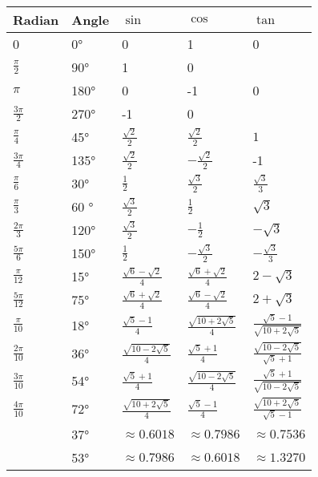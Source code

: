 \documentclass[a4paper,12pt]{report}
\begin{document}
{\fontsize{8pt}{10pt}\selectfont
\begin{longtable}[c]{|p{}|p{}|p{}|p{}|p{}|}
\hline
Radian & Angle & $\sin$ & $\cos$ & $\tan$ \\\hline\endhead
0 & 0° & 0 & 1 & 0 \\\hline
$\frac{\pi}{2}$ & 90° & 1 & 0 & \\\hline
$\pi$ & 180° & 0 & -1 & 0 \\\hline
$\frac{3\pi}{2}$ & 270° & -1 & 0 & \\\hline
$\frac{\pi}{4}$ & 45° & $\frac{\sqrt{2}}{2}$ & $\frac{\sqrt{2}}{2}$ & $1$ \\\hline
$\frac{3\pi}{4}$ & 135° & $\frac{\sqrt{2}}{2}$ & $-\frac{\sqrt{2}}{2}$ & -1 \\\hline
$\frac{\pi}{6}$ & 30° & $\frac{1}{2}$ & $\frac{\sqrt{3}}{2}$ & $\frac{\sqrt{3}}{3}$ \\\hline
$\frac{\pi}{3}$ & 60 ° & $\frac{\sqrt{3}}{2}$ & $\frac{1}{2}$ & $\sqrt{3}$ \\\hline
$\frac{2\pi}{3}$ & 120° & $\frac{\sqrt{3}}{2}$ & $-\frac{1}{2}$ & $-\sqrt{3}$ \\\hline
$\frac{5\pi}{6}$ & 150° & $\frac{1}{2}$ & $-\frac{\sqrt{3}}{2}$ & $-\frac{\sqrt{3}}{3}$ \\\hline
$\frac{\pi}{12}$ & 15° & $\frac{\sqrt{6}-\sqrt{2}}{4}$ & $\frac{\sqrt{6}+\sqrt{2}}{4}$ & $2-\sqrt{3}$ \\\hline
$\frac{5\pi}{12}$ & 75° & $\frac{\sqrt{6}+\sqrt{2}}{4}$ & $\frac{\sqrt{6}-\sqrt{2}}{4}$ & $2+\sqrt{3}$ \\\hline
$\frac{\pi}{10}$ & 18° & $\frac{\sqrt{5}-1}{4}$ & $\frac{\sqrt{10+2\sqrt{5}}}{4}$ & $\frac{\sqrt{5}-1}{\sqrt{10+2\sqrt{5}}}$ \\\hline
$\frac{2\pi}{10}$ & 36° & $\frac{\sqrt{10-2\sqrt{5}}}{4}$ & $\frac{\sqrt{5}+1}{4}$ & $\frac{\sqrt{10-2\sqrt{5}}}{\sqrt{5}+1}$ \\\hline
$\frac{3\pi}{10}$ & 54° & $\frac{\sqrt{5}+1}{4}$ & $\frac{\sqrt{10-2\sqrt{5}}}{4}$ & $\frac{\sqrt{5}+1}{\sqrt{10-2\sqrt{5}}}$ \\\hline
$\frac{4\pi}{10}$ & 72° & $\frac{\sqrt{10+2\sqrt{5}}}{4}$ & $\frac{\sqrt{5}-1}{4}$ & $\frac{\sqrt{10+2\sqrt{5}}}{\sqrt{5}-1}$ \\\hline
& 37° & $\approx 0.6018$ & $\approx 0.7986$ & $\approx 0.7536$ \\\hline
& 53° & $\approx 0.7986$ & $\approx 0.6018$ & $\approx 1.3270$ \\\hline
\end{longtable}
\FB}
\end{document}
